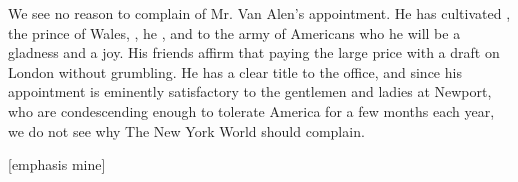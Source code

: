 \begin{ipquote}
{We see no reason to complain of Mr. Van Alen’s appointment. He has cultivated , the prince of Wales, , he , and to the army of Americans who  he will be a gladness and a joy. His friends affirm that  paying the large price with a draft on London without grumbling. He has a clear title to the office, and since his appointment is eminently satisfactory to the gentlemen and ladies at Newport, who are condescending enough to tolerate America for a few months each year, we do not see why The New York World should complain.

\raggedleft
{[emphasis mine]}\\
}
\end{ipquote}

